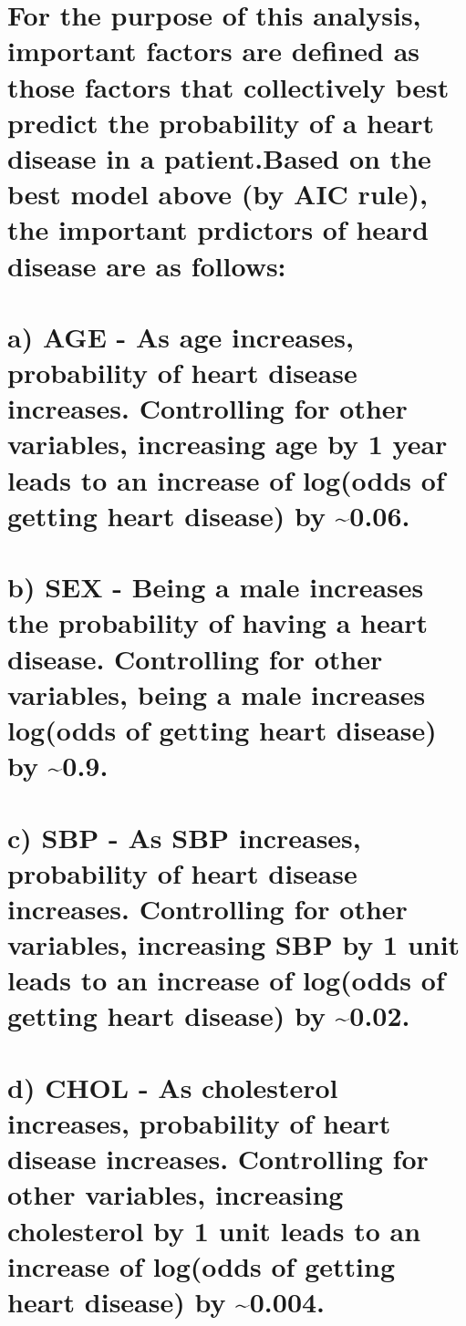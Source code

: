 \documentclass[]{article}
\begin{document}
\section{For the purpose of this analysis, important factors are defined
as those factors that collectively best predict the probability of a
heart disease in a patient.Based on the best model above (by AIC rule),
the important prdictors of heard disease are as
follows:}\label{for-the-purpose-of-this-analysis-important-factors-are-defined-as-those-factors-that-collectively-best-predict-the-probability-of-a-heart-disease-in-a-patient.based-on-the-best-model-above-by-aic-rule-the-important-prdictors-of-heard-disease-are-as-follows}

\section{a) AGE - As age increases, probability of heart disease
increases. Controlling for other variables, increasing age by 1 year
leads to an increase of log(odds of getting heart disease) by
\textasciitilde{}0.06.}\label{a-age---as-age-increases-probability-of-heart-disease-increases.-controlling-for-other-variables-increasing-age-by-1-year-leads-to-an-increase-of-logodds-of-getting-heart-disease-by-0.06.}

\section{b) SEX - Being a male increases the probability of having a
heart disease. Controlling for other variables, being a male increases
log(odds of getting heart disease) by
\textasciitilde{}0.9.}\label{b-sex---being-a-male-increases-the-probability-of-having-a-heart-disease.-controlling-for-other-variables-being-a-male-increases-logodds-of-getting-heart-disease-by-0.9.}

\section{c) SBP - As SBP increases, probability of heart disease
increases. Controlling for other variables, increasing SBP by 1 unit
leads to an increase of log(odds of getting heart disease) by
\textasciitilde{}0.02.}\label{c-sbp---as-sbp-increases-probability-of-heart-disease-increases.-controlling-for-other-variables-increasing-sbp-by-1-unit-leads-to-an-increase-of-logodds-of-getting-heart-disease-by-0.02.}

\section{d) CHOL - As cholesterol increases, probability of heart
disease increases. Controlling for other variables, increasing
cholesterol by 1 unit leads to an increase of log(odds of getting heart
disease) by
\textasciitilde{}0.004.}\label{d-chol---as-cholesterol-increases-probability-of-heart-disease-increases.-controlling-for-other-variables-increasing-cholesterol-by-1-unit-leads-to-an-increase-of-logodds-of-getting-heart-disease-by-0.004.}
\end{document}
